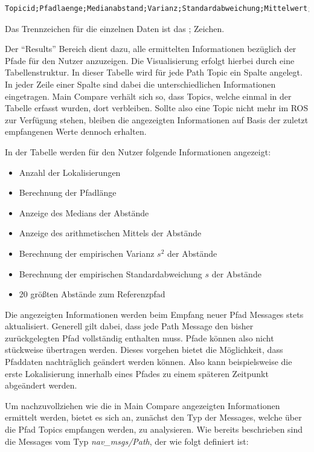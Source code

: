 \begin{lstlisting}[caption=Format der Export CSV Datei, label=lst:export]
Topicid;Pfadlaenge;Medianabstand;Varianz;Standardabweichung;Mittelwert;Zeitstempel;x;y;z;Abstand
\end{lstlisting}

Das Trennzeichen für die einzelnen Daten ist das ; Zeichen.


Der ``Results'' Bereich dient dazu, alle ermittelten Informationen bezüglich der
Pfade für den Nutzer anzuzeigen. Die Visualisierung erfolgt hierbei durch eine
Tabellenstruktur. In dieser Tabelle wird für jede Path Topic ein Spalte
angelegt.
In jeder Zeile einer Spalte sind dabei die unterschiedlichen
Informationen eingetragen.
Main Compare verhält sich so, dass Topics, welche einmal in
der Tabelle erfasst wurden, dort verbleiben. Sollte also eine Topic nicht
mehr im ROS zur Verfügung stehen, bleiben die angezeigten Informationen auf
Basis der zuletzt empfangenen Werte dennoch erhalten. 

In der Tabelle werden für den Nutzer folgende Informationen angezeigt:

\begin{itemize}
  \item Anzahl der Lokalisierungen
  \item Berechnung der Pfadlänge
  \item Anzeige des Medians der Abstände
  \item Anzeige des arithmetischen Mittels der Abstände
  \item Berechnung der empirischen Varianz $s^2$ der Abstände
  \item Berechnung der empirischen Standardabweichung $s$ der Abstände
  \item 20 größten Abstände zum Referenzpfad
\end{itemize}

Die angezeigten Informationen werden beim Empfang neuer Pfad Messages stets
aktualisiert. Generell gilt dabei, dass jede Path Message den bisher
zurückgelegten Pfad vollständig
enthalten muss. Pfade können also nicht stückweise übertragen werden. Dieses vorgehen
bietet die Möglichkeit, dass Pfaddaten nachträglich geändert werden können.
Also kann beispielsweise die erste Lokalisierung innerhalb eines Pfades zu einem
späteren Zeitpunkt abgeändert werden. 

Um nachzuvollziehen wie die in Main Compare angezeigten Informationen ermittelt werden, bietet
es sich an, zunächst den Typ der Messages, welche über die Pfad Topics
empfangen werden, zu analysieren. 
Wie bereits beschrieben sind die Messages vom Typ
\textit{nav\_msgs/Path}, der wie folgt definiert ist:

